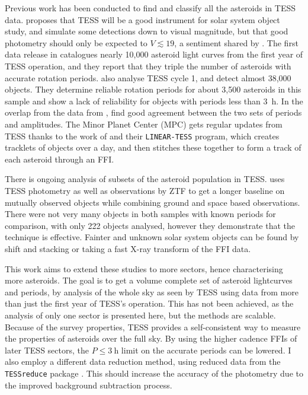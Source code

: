 \documentclass{UCreport}
\begin{document}
Previous work has been conducted to find and classify all the asteroids in TESS data.
\citet{Pal2018} proposes that TESS will be a good instrument for solar system object study, and simulate some detections down to  visual magnitude, but that good photometry should only be expected to $V \lesssim 19$, a sentiment shared by \citet{Wong2019}.
The first data release in \citet{Pal2020} catalogues nearly 10,000 asteroid light curves from the first year of TESS operation, and they report that they triple the number of asteroids with accurate rotation periods.
\citet{McNeill2023} also analyse TESS cycle 1, and detect almost 38,000 objects.
They determine reliable rotation periods for about 3,500 asteroids in this sample and show a lack of reliability for objects with periods less than \qty{3}{\hour}.
In the overlap from the data from \citet{Pal2020}, \citeauthor{McNeill2023} find good agreement between the two sets of periods and amplitudes.
The Minor Planet Center (MPC) gets regular updates from TESS thanks to the work of \citet{Woods2021} and their \texttt{LINEAR-TESS} program, which creates tracklets of objects over a day, and then stitches these together to form a track of each asteroid through an FFI.

There is ongoing analysis of subsets of the asteroid population in TESS.
\citet{Gowanlock2024} uses TESS photometry as well as  observations by ZTF to get a longer baseline on mutually observed objects while combining ground and space based observations.
There were not very many objects in both samples with known periods for comparison, with only 222 objects analysed, however they demonstrate that the technique is effective.
Fainter and unknown solar system objects can be found by shift and stacking \citep{Holman2019, Payne2019,Rice2020} or taking a fast X-ray transform \citep{Nguyen2024} of the FFI data.

This work aims to extend these studies to more sectors, hence characterising more asteroids.
The goal is to get a volume complete set of asteroid lightcurves and periods, by analysis of the whole sky as seen by TESS using data from more than just the first year of TESS's operation.
This has not been achieved, as the analysis of only one sector is presented here, but the methods are scalable.
Because of the survey properties, TESS provides a self-consistent way to measure the properties of asteroids over the full sky.
By using the higher cadence FFIs of later TESS sectors, the $P\leq\qty{3}{\hour}$ limit on the accurate periods \citep[as found by ][]{McNeill2023} can be lowered.
I also employ a different data reduction method, using reduced data from the \texttt{TESSreduce} package \citep{Ridden-Harper2021}.
This should increase the accuracy of the photometry due to the improved background subtraction process.
\end{document}
